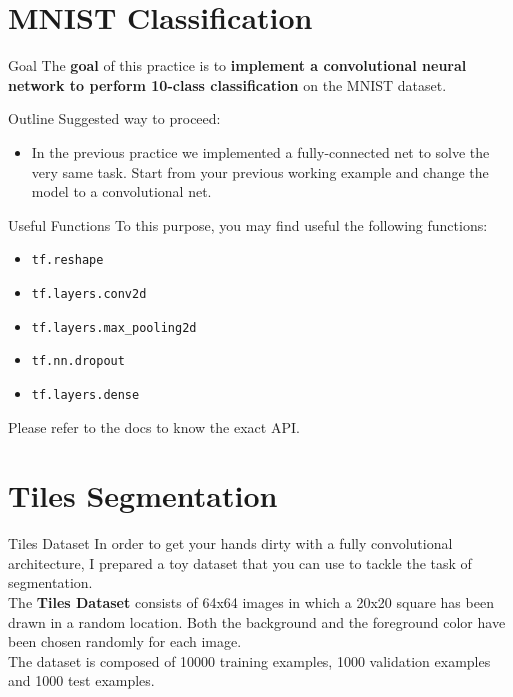 \documentclass[aspectratio=169]{beamer}
\begin{document}
\section{MNIST Classification}


\begin{frame}{Goal}
The \textbf{goal} of this practice is to \textbf{implement a convolutional neural network to perform 10-class classification} on the MNIST dataset.
\end{frame}


\begin{frame}{Outline}
Suggested way to proceed:
\begin{itemize}
\item In the previous practice we implemented a fully-connected net to solve the very same task. Start from your previous working example and change the model to a convolutional net.
\end{itemize}
\end{frame}


\begin{frame}{Useful Functions}
To this purpose, you may find useful the following functions:
\begin{itemize}
\item \texttt{tf.reshape}
\item \texttt{tf.layers.conv2d}
\item \texttt{tf.layers.max\_pooling2d}
\item \texttt{tf.nn.dropout}
\item \texttt{tf.layers.dense}
\end{itemize}
Please refer to the docs to know the exact API.
\end{frame}


\section{Tiles Segmentation}

\begin{frame}{Tiles Dataset}
In order to get your hands dirty with a fully convolutional architecture, I prepared a toy dataset that you can use to tackle the task of segmentation.\\
\vspace{0.5cm}
The \textbf{Tiles Dataset} consists of 64x64 images in which a 20x20 square has been drawn in a random location. Both the background and the foreground color have been chosen randomly for each image.\\
\vspace{0.5cm}
The dataset is composed of 10000 training examples, 1000 validation examples and 1000 test examples.
\end{frame}
\end{document}
